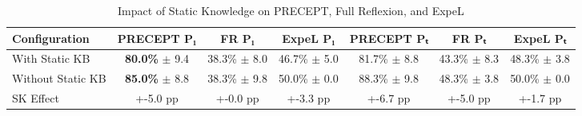 \begin{table}[t]
\centering
\caption{Impact of Static Knowledge on PRECEPT, Full Reflexion, and ExpeL}
\label{tab:static_knowledge}
\begin{tabular}{lcccccc}
\toprule
Configuration & PRECEPT P₁ & FR P₁ & ExpeL P₁ & PRECEPT Pₜ & FR Pₜ & ExpeL Pₜ \\
\midrule
With Static KB & \textbf{80.0\%} $\pm$ 9.4 & 38.3\% $\pm$ 8.0 & 46.7\% $\pm$ 5.0 & 81.7\% $\pm$ 8.8 & 43.3\% $\pm$ 8.3 & 48.3\% $\pm$ 3.8 \\
Without Static KB & \textbf{85.0\%} $\pm$ 8.8 & 38.3\% $\pm$ 9.8 & 50.0\% $\pm$ 0.0 & 88.3\% $\pm$ 9.8 & 48.3\% $\pm$ 3.8 & 50.0\% $\pm$ 0.0 \\
\midrule
SK Effect & +-5.0 pp & +-0.0 pp & +-3.3 pp & +-6.7 pp & +-5.0 pp & +-1.7 pp \\
\bottomrule
\end{tabular}
\end{table}